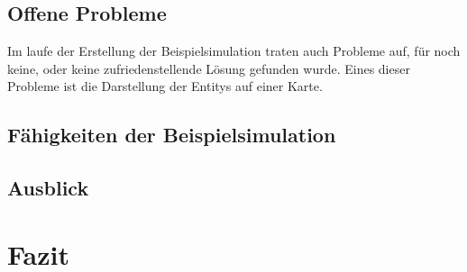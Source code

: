 \section{Offene Probleme}\label{open_prob}
Im laufe der Erstellung der Beispielsimulation traten auch Probleme auf, für noch keine, oder keine zufriedenstellende Lösung gefunden wurde. Eines dieser Probleme ist die Darstellung der Entitys auf einer Karte.   

\section{Fähigkeiten der Beispielsimulation}

\section{Ausblick}
\chapter{Fazit}